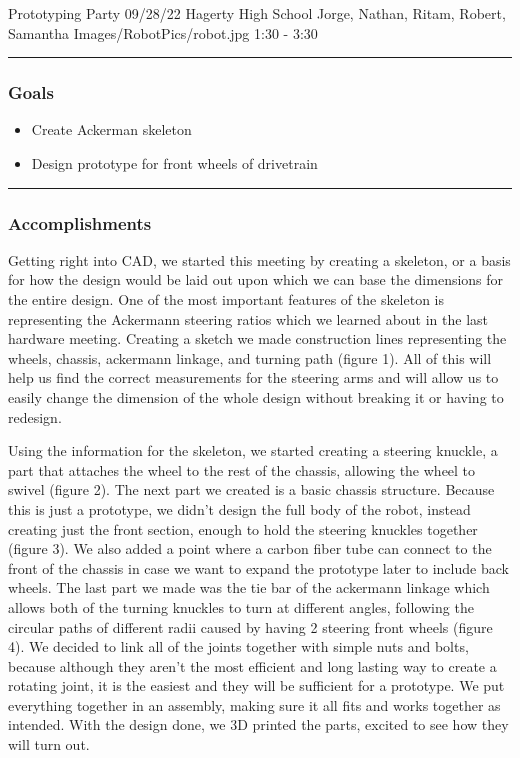 \insertmeeting 
	{Prototyping Party} 
	{09/28/22} 
	{Hagerty High School}
	{Jorge, Nathan, Ritam, Robert, Samantha}
	{Images/RobotPics/robot.jpg}
	{1:30 - 3:30}
	
\noindent\hfil\rule{\textwidth}{.4pt}\hfil
\subsubsection*{Goals}
\begin{itemize}
    \item Create Ackerman skeleton
    \item Design prototype for front wheels of drivetrain


\end{itemize} 

\noindent\hfil\rule{\textwidth}{.4pt}\hfil

\subsubsection*{Accomplishments}

Getting right into CAD, we started this meeting by creating a skeleton, or a basis for how the design would be laid out upon which we can base the dimensions for the entire design. One of the most important features of the skeleton is representing the Ackermann steering ratios which we learned about in the last hardware meeting. Creating a sketch we made construction lines representing the wheels, chassis, ackermann linkage, and turning path (figure 1). All of this will help us find the correct measurements for the steering arms and will allow us to easily change the dimension of the whole design without breaking it or having to redesign.

Using the information for the skeleton, we started creating a steering knuckle, a part that attaches the wheel to the rest of the chassis, allowing the wheel to swivel (figure 2). The next part we created is a basic chassis structure. Because this is just a prototype, we didn’t design the full body of the robot, instead creating just the front section, enough to hold the steering knuckles together (figure 3). We also added a point where a carbon fiber tube can connect to the front of the chassis in case we want to expand the prototype later to include back wheels. The last part we made was the tie bar of the ackermann linkage which allows both of the turning knuckles to turn at different angles, following the circular paths of different radii caused by having 2 steering front wheels (figure 4). We decided to link all of the joints together with simple nuts and bolts, because although they aren't the most efficient and long lasting way to create a rotating joint, it is the easiest and they will be sufficient for a prototype. We put everything together in an assembly, making sure it all fits and works together as intended. With the design done, we 3D printed the parts, excited to see how they will turn out.


